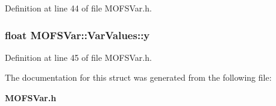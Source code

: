 Definition at line 44 of file M\-O\-F\-S\-Var.\-h.

\subsubsection[{y}]{\setlength{\rightskip}{0pt plus 5cm}float M\-O\-F\-S\-Var\-::\-Var\-Values\-::y}\label{structMOFSVar_1_1VarValues_a14b6877731e6bfa98908d3682d07f979}


Definition at line 45 of file M\-O\-F\-S\-Var.\-h.



The documentation for this struct was generated from the following file\-:\begin{DoxyCompactItemize}
\item 
{\bf M\-O\-F\-S\-Var.\-h}\end{DoxyCompactItemize}
